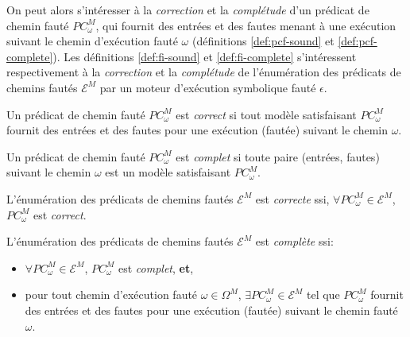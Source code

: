             On peut alors s'intéresser à la \textit{correction} et la \textit{complétude} d'un prédicat de chemin fauté $PC^M_{\omega}$, qui fournit des entrées et des fautes menant à une exécution suivant le chemin d'exécution fauté $\omega$ (définitions \ref{def:pcf-sound} et \ref{def:pcf-complete}).
            Les définitions \ref{def:fi-sound} et \ref{def:fi-complete} s'intéressent respectivement à la \textit{correction} et la \textit{complétude} de l'énumération des prédicats de chemins fautés $\mathcal{E}^M$ par un moteur d'exécution symbolique fauté $\epsilon$.
            
            \begin{defi}
            \label{def:pcf-sound}
                Un prédicat de chemin fauté $PC^M_{\omega}$ est \textit{correct} si tout modèle satisfaisant $PC^M_{\omega}$ fournit des entrées et des fautes pour une exécution (fautée) suivant le chemin $\omega$.
            \end{defi}
            
            \begin{defi}
            \label{def:pcf-complete}
                Un prédicat de chemin fauté $PC^M_{\omega}$ est \textit{complet} si toute paire (entrées, fautes) suivant le chemin $\omega$ est un modèle satisfaisant $PC^M_{\omega}$.
            \end{defi}

            \begin{sloppypar}
            \begin{defi}
            \label{def:fi-sound}
                L'énumération des prédicats de chemins fautés $\mathcal{E}^M$ est \textit{correcte} ssi, $\forall PC^M_{\omega} \in \mathcal{E}^M$, $PC^M_{\omega}$ est \textit{correct}.
            \end{defi}
            \end{sloppypar}
            
            \begin{defi}
            \label{def:fi-complete}
                L'énumération des prédicats de chemins fautés $\mathcal{E}^M$ est \textit{complète} ssi:
                \begin{itemize}
                    \item $\forall PC^M_{\omega} \in \mathcal{E}^M$, $PC^M_{\omega}$ est \textit{complet}, \textbf{et},
                    \item pour tout chemin d'exécution fauté $\omega \in \Omega^M$, $\exists PC^M_{\omega} \in \mathcal{E}^M$ tel que $PC^M_{\omega}$ fournit des entrées et des fautes pour une exécution (fautée) suivant le chemin fauté $\omega$.
                \end{itemize}
            \end{defi}

